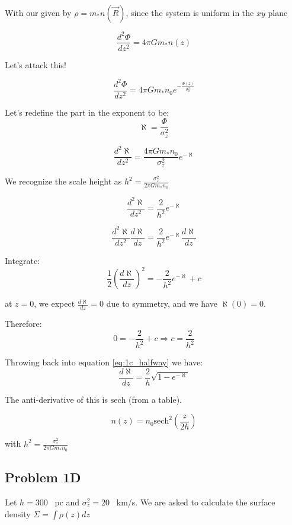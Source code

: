 With our given by $\rho = m_* n(\vec{R})$, since the system is uniform in the $xy$ plane

\begin{equation}
    \frac{d^2\Phi}{dz^2} = 4\pi Gm_*n(z)
\end{equation}

Let's attack this!

\begin{equation}
    \frac{d^2\Phi}{dz^2} = 4\pi Gm_*n_0 e^{-\frac{\Phi(z)}{\sigma_z^2}}
\end{equation}

Let's redefine the part in the exponent to be:
\begin{equation}
    \aleph = \frac{\Phi}{\sigma_z^2}
\end{equation}

\begin{equation}
    \frac{d^2\aleph}{dz^2} = \frac{4\pi Gm_*n_0}{\sigma_z^2} e^{- \aleph}
\end{equation}

We recognize the scale height as $\boxed{h^2 = \frac{\sigma_z^2}{2\pi Gm_*n_0}}$

\begin{equation}
    \frac{d^2\aleph}{dz^2} = \frac{2}{h^2} e^{- \aleph}
\end{equation}

\begin{equation}
    \frac{d^2\aleph}{dz^2}\frac{d\aleph}{dz} = \frac{2}{h^2} e^{- \aleph}\frac{d\aleph}{dz}
\end{equation}

Integrate:
\begin{equation} \label{eq:1c_halfway}
    \frac{1}{2}(\frac{d\aleph}{dz})^2 = -\frac{2}{h^2} e^{- \aleph} +c
\end{equation}

at $z = 0$, we expect $\frac{d\aleph}{dz} = 0 $ due to symmetry, and we have $\aleph(0) = 0$.

Therefore:
\begin{equation}
   0 = -\frac{2}{h^2} +c \Rightarrow c =  \frac{2}{h^2}
\end{equation}

Throwing back into equation \ref{eq:1c_halfway} we have:
\begin{equation}
    \frac{d\aleph}{dz} = \frac{2}{h} \sqrt{1 - e^{-\aleph}}
\end{equation}

The anti-derivative of this is $\mathrm{sech}$ (from a table).

\begin{equation}
    \boxed{n(z) = n_0 \mathrm{sech}^2(\frac{z}{2h})}
\end{equation}

with $\boxed{h^2 = \frac{\sigma_z^2}{2\pi Gm_*n_0}}$





\subsection*{Problem 1D}
Let $h = 300$ \, pc and $\sigma_z^2 = 20$ \, km/s. We are asked to calculate the surface density $\Sigma = \int \rho (z) dz$




